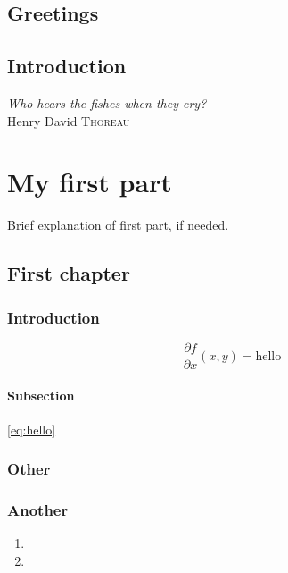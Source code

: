 \documentclass[a4paper,12pt,twoside]{mybook} %
\author{Author 1 \\ \texttt{ID} \and Author 2 \\ \texttt{ID} \and Author 3 \\ \texttt{ID} \and Author 4 \\ \texttt{ID}}
\begin{document}
\setlength{\baselineskip}{.70cm}
\frontmatter

\maketitle
\clearpage

\pagestyle{\auxsettings}


\tableofcontents
\etocsettocstyle{}{} %
\clearpage

\chapter{Greetings}
\lipsum[3]

\chapter{Introduction}
\begin{flushright}
\textit{Who hears the fishes when they cry?}\\
Henry David \textsc{Thoreau}
\end{flushright}
\lipsum[1-5]
\clearpage

\pagestyle{\defaultsettings}
\mainmatter
\part{My first part}{Brief explanation of first part, if needed.}
\chapter{First chapter}
\section{Introduction}
\lipsum[1-3]
\begin{equation}\label{eq:hello}
    \frac{\partial f}{\partial x}(x,y)=\text{hello}
\end{equation}
\subsection{Subsection}
\lipsum[4-8] \eqref{eq:hello}
\section{Other}
\lipsum[10-13]
\section{Another}
\begin{enumerate}
    \item \lipsum[14]
    \item \lipsum[15]
\end{enumerate}
\lipsum[16-22]
\end{document}
